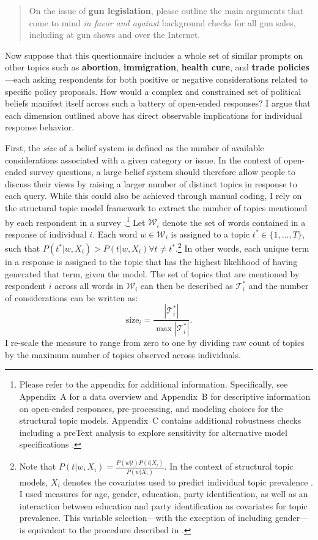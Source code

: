 \begin{quote}
	On the issue of \textbf{gun legislation}, please outline the main arguments that come to mind \textit{in favor and against} background checks for all gun sales, including at gun shows and over the Internet.
\end{quote}

Now suppose that this questionnaire includes a whole set of similar prompts on other topics such as \textbf{abortion}, \textbf{immigration}, \textbf{health cure}, and \textbf{trade policies}---each asking respondents for both positive or negative considerations related to specific policy proposals. How would a complex and constrained set of political beliefs manifest itself across such a battery of open-ended responses? I argue that each dimension outlined above has direct observable implications for individual response behavior.

First, the \textit{size} of a belief system is defined as the number of available considerations associated with a given category or issue. In the context of open-ended survey questions, a large belief system should therefore allow people to discuss their views by raising a larger number of distinct topics in response to each query. While this could also be achieved through manual coding, I rely on the structural topic model framework to extract the number of topics mentioned by each respondent in a survey \citep{roberts2014structural}.\footnote{Please refer to the appendix for additional information. Specifically, see Appendix~A for a data overview and Appendix~B for descriptive information on open-ended responses, pre-processing, and modeling choices for the structural topic models. Appendix~C contains additional robustness checks including a preText analysis to explore sensitivity for alternative model specifications \citep{denny2018text}.} Let $\mathcal{W}_i$ denote the set of words contained in a response of individual $i$. Each word $w\in\mathcal{W}_i$ is assigned to a topic $t^* \in \{1,...,T\} $, such that $P(t^*|w,X_i) > P(t|w,X_i) \forall t\neq t^*$.\footnote{Note that $P(t|w,X_i)=\tfrac{P(w|t)P(t|X_i)}{P(w|X_i)}$. In the context of structural topic models, $X_i$ denotes the covariates used to predict individual topic prevalence \citep[see][for details]{roberts2014structural}. I used measures for age, gender, education, party identification, as well as an interaction between education and party identification as covariates for topic prevalence. This variable selection---with the exception of including gender---is equivalent to the procedure described in \citet{roberts2014structural}.} In other words, each unique term in a response is assigned to the topic that has the highest likelihood of having generated that term, given the model. The set of topics that are mentioned by respondent $i$ across all words in $\mathcal{W}_i$ can then be described as $\mathcal{T}^*_i$ and the number of considerations can be written as:
\begin{equation}
\text{size}_i = \dfrac{|\mathcal{T}^*_i|}{\max|\mathcal{T}^*_i|}.
\end{equation}
I re-scale the measure to range from zero to one by dividing raw count of topics by the maximum number of topics observed across individuals.


